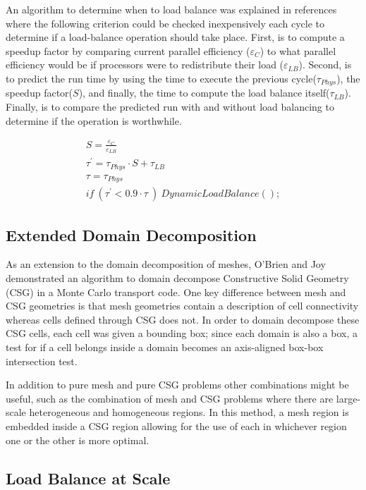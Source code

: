 An algorithm to determine when to load balance was explained in references~\cite{procassini2005load}~\cite{o2005dynamic} where the following criterion could be checked inexpensively each cycle to determine if a load-balance operation should take place.
%
First, is to compute a speedup factor by comparing current parallel efficiency ($ \varepsilon_C $) to what parallel efficiency would be if processors were to redistribute their load ($ \varepsilon_{LB} $).
%
Second, is to predict the run time by using the time to execute the previous cycle($ \tau_{Phys} $), the speedup factor($S$), and finally, the time to compute the load balance itself($ \tau_{LB} $).
%
Finally, is to compare the predicted run with and without load balancing to determine if the operation is worthwhile.~\cite{o2005dynamic}


\begin{eqnarray}
S = \frac{\varepsilon_C}{\varepsilon_{LB}} \\
\tau^{'} = \tau_{Phys} \cdot S + \tau_{LB} \\
\tau = \tau_{Phys} \\
if\ (\tau^{'} < 0.9 \cdot \tau \ )\ DynamicLoadBalance();
\end{eqnarray}

\subsection*{Extended Domain Decomposition}

As an extension to the domain decomposition of meshes, O'Brien and Joy demonstrated an algorithm to domain decompose Constructive Solid Geometry (CSG) in a Monte Carlo transport code.
%
One key difference between mesh and CSG geometries is that mesh geometries contain a description of cell connectivity whereas cells defined through CSG does not.
%
In order to domain decompose these CSG cells, each cell was given a bounding box; since each domain is also a box, a test for if a cell belongs inside a domain becomes an axis-aligned box-box intersection test.~\cite{o2009domain}
%

In addition to pure mesh and pure CSG problems other combinations might be useful, such as the combination of mesh and CSG problems where there are large-scale heterogeneous and homogeneous regions.
%
In this method, a mesh region is embedded inside a CSG region allowing for the use of each in whichever region one or the other is more optimal.
~\cite{greenman2009enhancements}

\subsection*{Load Balance at Scale}

